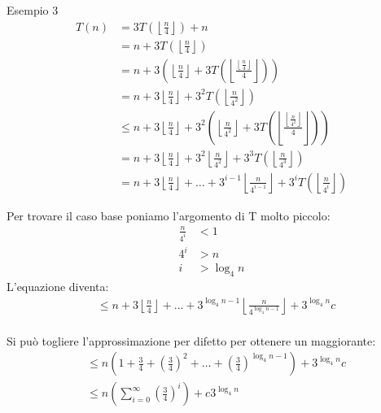 \documentclass[a4paper]{article}
\begin{document}
\begin{examplebox}{Esempio 3}
  \[
    \begin{aligned}
      T(n) & = 3T \left( \left\lfloor \frac{n}{4} \right\rfloor \right) + n\\
           & = n + 3T \left( \left\lfloor \frac{n}{4} \right\rfloor \right)\\
           & = n + 3 \left( \left\lfloor \frac{n}{4} \right\rfloor + 3T 
           \left( \left\lfloor \frac{\left\lfloor \frac{n}{4} \right\rfloor}{4} \right\rfloor
           \right)  \right)\\
           & = n + 3 \left\lfloor \frac{n}{4} \right\rfloor + 3^2 T 
           \left( \left\lfloor \frac{n}{4^2} \right\rfloor \right)\\
           & \le n + 3 \left\lfloor \frac{n}{4} \right\rfloor + 3^2 
           \left( \left\lfloor \frac{n}{4^2} \right\rfloor + 3T \left( 
           \left\lfloor \frac{\left\lfloor \frac{n}{4^2} \right\rfloor}{4} \right\rfloor
           \right)  \right) \\
           & = n + 3 \left\lfloor \frac{n}{4} \right\rfloor + 3^2
           \left\lfloor \frac{n}{4^2} \right\rfloor + 3^3 T
           \left( \left\lfloor \frac{n}{4^3} \right\rfloor \right) \\
           & = n + 3 \left\lfloor \frac{n}{4} \right\rfloor + \ldots + 3^{i-1}
           \left\lfloor \frac{n}{4^{i-1}} \right\rfloor + 3^i T
           \left( \left\lfloor \frac{n}{4^i} \right\rfloor \right) 
    \end{aligned}
  \]


  Per trovare il caso base poniamo l'argomento di T molto piccolo:
  \[
    \begin{aligned}
      \frac{n}{4^i} & < 1\\
      4^i & > n\\
      i & > \log_4 n
    \end{aligned}
  \] 
  L'equazione diventa:
  \[
    \begin{aligned}
      & \le n + 3 \left\lfloor \frac{n}{4} \right\rfloor + \ldots + 3^{\log_4 n - 1}
      \left\lfloor \frac{n}{4^{\log_4 n - 1}} \right\rfloor + 3^{\log_4 n} c\\
    \end{aligned}
  \] 


  Si può togliere l'approssimazione per difetto per ottenere un maggiorante:
  \[
  \begin{aligned}
    & \le n \left( 1 + \frac{3}{4} + \left( \frac{3}{4} \right)^2 + \ldots +
    \left( \frac{3}{4} \right)^{\log_4 n-1} \right) + 3^{\log_4 n} c\\
    & \le n \left( \sum_{i=0}^{\infty} \left( \frac{3}{4} \right)^i \right) + c 3^{\log_4 n}\\
  \end{aligned}
  \] 
    \end{examplebox}
\end{document}
